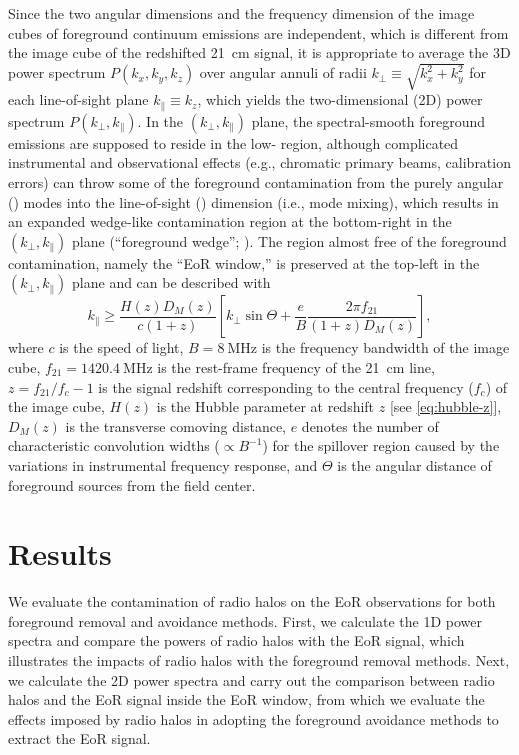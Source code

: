 \documentclass[twocolumn]{aastex62}
\newcommand{\klos}{\text{$k_{\parallel}$}}
\newcommand{\kperp}{\text{$k_{\bot}$}}
\begin{document}
Since the two angular dimensions and the frequency dimension of the image
cubes of foreground continuum emissions are independent, which is
different from the image cube of the redshifted 21~cm signal, it is
appropriate to average the 3D power spectrum $P(k_x, k_y, k_z)$
over angular annuli of radii $\kperp \equiv \sqrt{k_x^2 + k_y^2}$
for each line-of-sight plane $\klos \equiv k_z$, which yields the
two-dimensional (2D) power spectrum $P(\kperp, \klos)$.
In the $(\kperp, \klos)$ plane, the spectral-smooth foreground emissions
are supposed to reside in the low-\klos{} region, although complicated
instrumental and observational effects (e.g., chromatic primary beams,
calibration errors) can throw some of the foreground contamination from
the purely angular (\kperp) modes into the line-of-sight (\klos)
dimension (i.e., mode mixing), which results in an expanded wedge-like
contamination region at the bottom-right in the $(\kperp, \klos)$ plane
(\enquote{foreground wedge}; \citealt{datta2010,morales2012,liu2014}).
The region almost free of the foreground contamination, namely the
\enquote{EoR window,} is preserved at the top-left in the
$(\kperp, \klos)$ plane and can be described with \citep{thyagarajan2013}
\begin{equation}
  \label{eq:eor-window}
  \klos \geq \frac{H(z) D_{\!M}(z)}{c (1+z)} \left[
    \kperp \sin\Theta +
    \frac{e}{B} \frac{2\pi f_{21}}{(1+z) D_{\!M}(z)} \right],
\end{equation}
where
$c$ is the speed of light,
$B = \SI{8}{\MHz}$ is the frequency bandwidth of the image cube,
$f_{21} = \SI{1420.4}{\MHz}$ is the rest-frame frequency of the 21~cm line,
$z = f_{21}/f_c - 1$ is the signal redshift corresponding to the central
frequency ($f_c$) of the image cube,
$H(z)$ is the Hubble parameter at redshift $z$ [see \autoref{eq:hubble-z}],
$D_{\!M}(z)$ is the transverse comoving distance,
$e$ denotes the number of characteristic convolution widths
($\propto B^{-1}$) for the spillover region caused by the variations in
instrumental frequency response,
and $\Theta$ is the angular distance of foreground sources from the
field center.


\section{Results}
\label{sec:results}

We evaluate the contamination of radio halos on the EoR observations for
both foreground removal and avoidance methods.
First, we calculate the 1D power spectra and compare the powers of
radio halos with the EoR signal, which illustrates the impacts of radio
halos with the foreground removal methods.
Next, we calculate the 2D power spectra and carry out the comparison
between radio halos and the EoR signal inside the EoR window, from
which we evaluate the effects imposed by radio halos in adopting the
foreground avoidance methods to extract the EoR signal.
\end{document}
